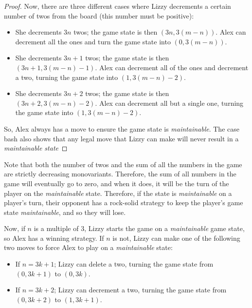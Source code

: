 \documentclass[10pt]{../usamts}
\begin{document}
\begin{solution}
\begin{proof}
    Now, there are three different cases where Lizzy decrements a certain number of twos from the board (this number must be positive):
    \begin{itemize}
        \item She decrements $3n$ twos; the game state is then $(3n, 3(m-n))$. Alex can decrement all the ones and turn the game state into $(0, 3(m-n))$.
        \item She decrements $3n+1$ twos; the game state is then $(3n+1, 3(m-n)-1)$. Alex can decrement all of the ones and decrement a two, turning the game state into $(1, 3(m-n)-2)$.
        \item She decrements $3n+2$ twos; the game state is then $(3n+2, 3(m-n)-2)$. Alex can decrement all but a single one, turning the game state into $(1, 3(m-n)-2)$.
    \end{itemize}

    So, Alex always has a move to ensure the game state is \textit{maintainable}. The case bash also shows that any legal move that Lizzy can make will never result in a \textit{maintainable state}
\end{proof}

Note that both the number of twos and the sum of all the numbers in the game are strictly decreasing monovariants. Therefore, the sum of all numbers in the game will eventually go to zero, and when it does, it  will be the turn of the player on the \textit{maintainable} state. Therefore, if the state is \textit{maintainable} on a player's turn, their opponent has a rock-solid strategy to keep the player's game state \textit{maintainable}, and so they will lose.

Now, if $n$ is a multiple of 3, Lizzy starts the game on a \textit{maintainable} game state, so Alex has a winning strategy. If $n$ is not, Lizzy can make one of the following two moves to force Alex to play on a \textit{maintainable} state:

\begin{itemize}
    \item If $n = 3k+1$; Lizzy can delete a two, turning the game state from $(0, 3k+1)$ to $(0, 3k)$.
    \item If $n = 3k+2$; Lizzy can decrement a two, turning the game state from $(0,3k+2)$ to $(1,3k+1)$.
\end{itemize}

\end{solution}
\end{document}
